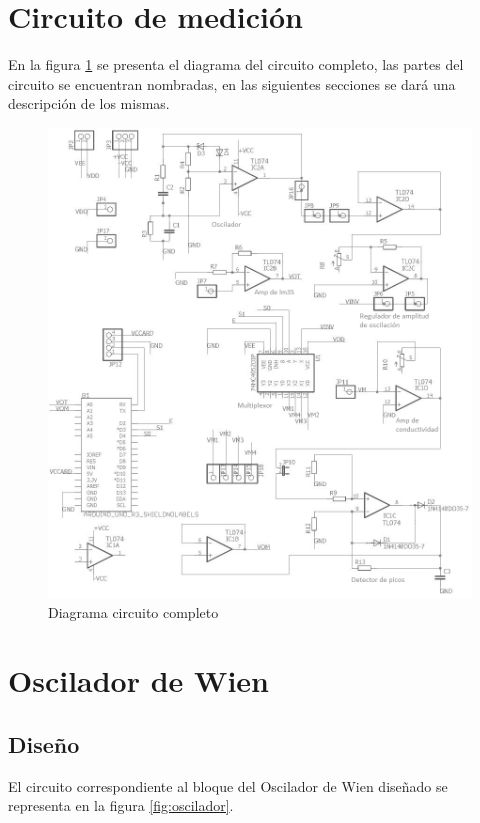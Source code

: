 \section{Circuito de medición}
En la figura \ref{fig:circuito_completo} se presenta el diagrama del circuito completo, las partes del circuito se encuentran nombradas, en las siguientes secciones se dará una descripción de los mismas.
\begin{figure}[H]
\centering
\includegraphics[width=1.1\textwidth]{circuito_completo.png}
\caption{Diagrama circuito completo}
\label{fig:circuito_completo}
\end{figure}

\section{Oscilador de Wien}
 \subsection{Diseño}
  El circuito correspondiente al bloque del Oscilador de Wien diseñado se representa en la figura \ref{fig:oscilador}.
  
 

